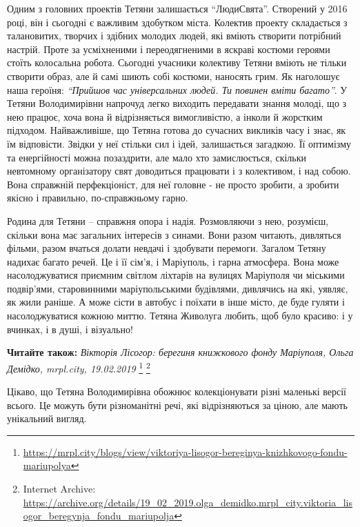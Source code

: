 
Одним з головних проектів Тетяни залишається \enquote{ЛюдиСвята}. Створений у 2016
році, він і сьогодні є важливим здобутком міста. Колектив проекту складається з
талановитих, творчих і здібних молодих людей, які вміють створити потрібний
настрій. Проте за усміхненими і переодягненими в яскраві костюми героями стоїть
колосальна робота. Сьогодні учасники колективу Тетяни вміють не тільки створити
образ, але й самі шиють собі костюми, наносять грим. Як наголошує наша героїня:
\emph{\enquote{Прийшов час універсальних людей. Ти повинен вміти багато}}. У Тетяни
Володимирівни напрочуд легко виходить передавати знання молоді, що з нею
працює, хоча вона й відрізняється вимогливістю, а інколи й жорстким підходом.
Найважливіше, що Тетяна готова до сучасних викликів часу і знає, як їм
відповісти. Звідки у неї стільки сил і ідей, залишається загадкою. Її оптимізму
та енергійності можна позаздрити, але мало хто замислюється, скільки невтомному
організатору свят доводиться працювати і з колективом, і над собою. Вона
справжній перфекціоніст, для неї головне - не просто зробити, а зробити якісно
і правильно, по-справжньому гарно.


Родина для Тетяни – справжня опора і надія. Розмовляючи з нею, розумієш,
скільки вона має загальних інтересів з синами. Вони разом читають, дивляться
фільми, разом вчаться долати невдачі і здобувати перемоги. Загалом Тетяну
надихає багато речей. Це і її сім'я, і Маріуполь, і гарна атмосфера. Вона може
насолоджуватися приємним світлом ліхтарів на вулицях Маріуполя чи міськими
подвір'ями, старовинними маріупольськими будівлями, дивлячись на які, уявляє,
як жили раніше. А може сісти в автобус і поїхати в інше місто, де буде гуляти і
насолоджуватися кожною миттю. Тетяна Живолуга любить, щоб було красиво: і у
вчинках, і в душі, і візуально!

\textbf{Читайте також:} \emph{Вікторія Лісогор: берегиня книжкового фонду Маріуполя, Ольга Демідко, mrpl.city, 19.02.2019}
\footnote{\url{https://mrpl.city/blogs/view/viktoriya-lisogor-bereginya-knizhkovogo-fondu-mariupolya}} %
\footnote{Internet Archive: \url{https://archive.org/details/19_02_2019.olga_demidko.mrpl_city.viktoria_lisogor_beregynja_fondu_mariupolja}}

Цікаво, що Тетяна Володимирівна обожнює колекціонувати різні маленькі версії
всього. Це можуть бути різноманітні речі, які відрізняються за ціною, але мають
унікальний вигляд.

